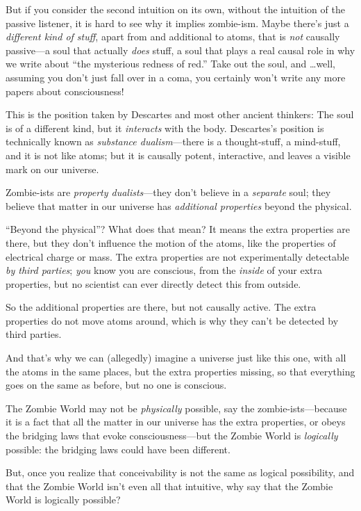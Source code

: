 {
 But if you consider the second intuition on its own, without the
intuition of the passive listener, it is hard to see why it implies
zombie-ism. Maybe there's just a \textit{different kind
of stuff}, apart from and additional to atoms, that is \textit{not}
causally passive---a soul that actually \textit{does} stuff, a soul
that plays a real causal role in why we write about
``the mysterious redness of red.''
Take out the soul, and \ldots well, assuming you don't
just fall over in a coma, you certainly won't write any
more papers about consciousness!}

{
 This is the position taken by Descartes and most other ancient
thinkers: The soul is of a different kind, but it \textit{interacts}
with the body. Descartes's position is technically
known as \textit{substance dualism}{}---there is a thought-stuff, a
mind-stuff, and it is not like atoms; but it is causally potent,
interactive, and leaves a visible mark on our universe.}

{
 Zombie-ists are \textit{property dualists}{}---they
don't believe in a \textit{separate} soul; they believe
that matter in our universe has \textit{additional properties} beyond
the physical.}

{
 ``Beyond the physical''? What
does that mean? It means the extra properties are there, but they
don't influence the motion of the atoms, like the
properties of electrical charge or mass. The extra properties are not
experimentally detectable \textit{by third parties}; \textit{you} know
you are conscious, from the \textit{inside} of your extra properties,
but no scientist can ever directly detect this from outside.}

{
 So the additional properties are there, but not causally active.
The extra properties do not move atoms around, which is why they
can't be detected by third parties.}

{
 And that's why we can (allegedly) imagine a
universe just like this one, with all the atoms in the same places, but
the extra properties missing, so that everything goes on the same as
before, but no one is conscious.}

{
 The Zombie World may not be \textit{physically} possible, say the
zombie-ists---because it is a fact that all the matter in our universe
has the extra properties, or obeys the bridging laws that evoke
consciousness---but the Zombie World is \textit{logically} possible:
the bridging laws could have been different.}

{
 But, once you realize that conceivability is not the same as
logical possibility, and that the Zombie World isn't
even all that intuitive, why say that the Zombie World is logically
possible?}

